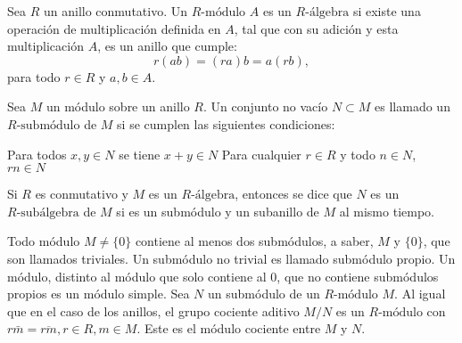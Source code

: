 \begin{definicion}
Sea $R$ un anillo conmutativo. Un $R\mbox{-módulo}$ $A$ es un $R\mbox{-álgebra}$ si existe una operación de multiplicación definida en $A$, tal que con su adición y esta multiplicación $A$, es un anillo que cumple: \[ r(ab) = (ra)b = a(rb), \] para todo $r \in R$ y $a,b \in A$.
\end{definicion}
\begin{definicion}
Sea $M$ un módulo sobre un anillo $R$. Un conjunto no vacío $N \subset M$ es llamado un $R\mbox{-submódulo}$ de $M$ si se cumplen las siguientes condiciones:
\begin{bulletList}
\newItem Para todos $x,y \in N$ se tiene $x + y \in N$
\newItem Para cualquier $r \in R$ y todo $n \in N$, $rn \in N$
\end{bulletList}
Si $R$ es conmutativo y $M$ es un $R\mbox{-álgebra}$, entonces  se dice que $N$ es un $R\mbox{-subálgebra}$ de $M$ si es un submódulo y un subanillo de $M$ al mismo tiempo. 
\end{definicion}
Todo módulo $M \neq \{0\}$ contiene al menos dos submódulos, a saber, $M$ y $\{0\}$, que son llamados triviales. Un submódulo no trivial es llamado submódulo propio. Un módulo, distinto al módulo que solo contiene al $0$, que no contiene submódulos propios es un  módulo simple. 
Sea $N$ un submódulo de un $R\mbox{-módulo}$ $M$. Al igual que en el caso de los anillos, el grupo cociente aditivo $M/N$ es un $R\mbox{-módulo}$ con $r\bar{m} = \overline{rm}, r\in R, m \in M$. Este es el módulo cociente entre $M$ y $N$. 


